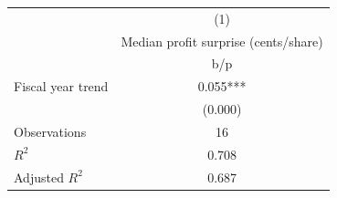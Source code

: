 {
\def\sym#1{\ifmmode^{#1}\else\(^{#1}\)\fi}
\begin{tabular}{l*{1}{c}}
\hline\hline
                    &\multicolumn{1}{c}{(1)}\\
                    &\multicolumn{1}{c}{Median profit surprise (cents/share)}\\
                    &         b/p   \\
\hline
Fiscal year trend   &       0.055***\\
                    &     (0.000)   \\
\hline
Observations        &          16   \\
\(R^{2}\)           &       0.708   \\
Adjusted \(R^{2}\)  &       0.687   \\
\hline\hline
\end{tabular}
}
